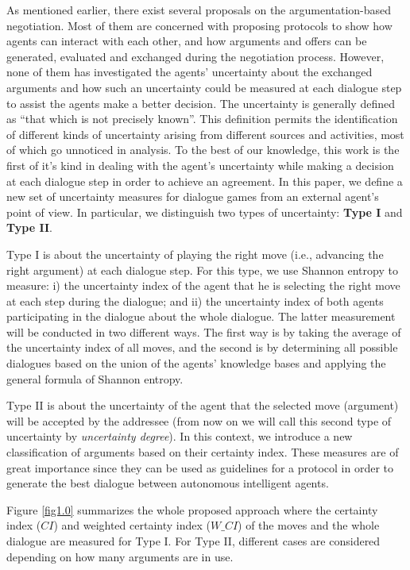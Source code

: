 As mentioned earlier, there exist several proposals on the argumentation-based negotiation. Most of them are concerned with proposing protocols to show how agents can
interact with each other, and how arguments and offers can be generated, evaluated and exchanged during the negotiation process. However, none of them has investigated
the agents' uncertainty about the exchanged arguments and how such an uncertainty could be measured at each dialogue step to assist the agents make a better decision. The
uncertainty is generally defined as ``that which is not precisely known''. This definition permits the identification of different kinds of uncertainty arising from different
sources and activities, most of which go unnoticed in analysis. To the best of our knowledge, this work is the first of it's kind in dealing with the agent's uncertainty
while making a decision at each dialogue step in order to achieve an agreement. In this paper, we define a new set of uncertainty measures for dialogue games from an
external agent's point of view. In particular, we distinguish two types of uncertainty: \textbf{Type I} and \textbf{Type II}.

Type I is about the uncertainty of playing the right move (i.e., advancing the right argument) at each dialogue step. For this type, we use Shannon entropy to measure: i) the
uncertainty index of the agent that he is selecting the right move at each step during the dialogue; and ii) the uncertainty index of both agents participating in the dialogue
about the whole dialogue. The latter measurement will be conducted in two different ways. The first way is by taking the average of the uncertainty index of all moves,
and the second is by determining all possible dialogues based on the union of the agents' knowledge bases and applying the general formula of Shannon entropy.

Type II is about the uncertainty of the agent that the selected move (argument) will be accepted by the addressee (from now on we will call this second type of uncertainty
by \emph{uncertainty degree}). In this context, we introduce a new classification of arguments based on their certainty index. These measures are of great importance since
they can be used as guidelines for a protocol in order to generate the best dialogue between autonomous intelligent agents.

Figure \ref{fig1.0} summarizes the whole proposed approach where the certainty index ($CI$) and weighted certainty index ($W\_CI$) of the moves and the whole dialogue are
measured for Type I. For Type II, different cases are considered depending on how many arguments are in use.

